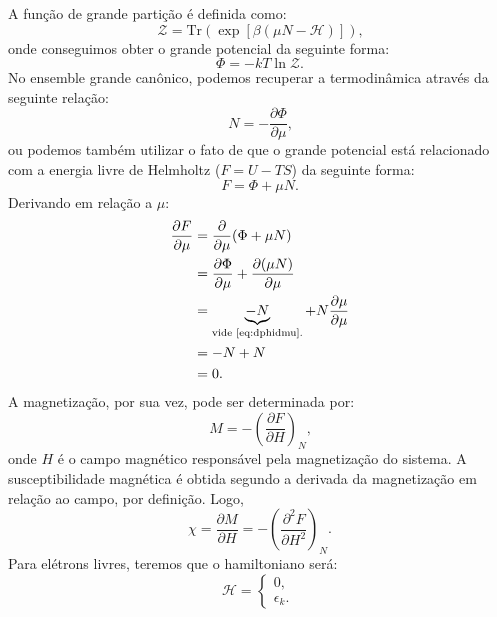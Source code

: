 \documentclass{article}
\newcommand{\Tr}{\mathrm{Tr}}
\begin{document}
A função de grande partição é definida como:
\begin{equation}\label{eq:grandpart}
 \mathcal{Z} = \Tr(\exp{[\beta (\mu N - \mathcal{H})]})\text{,}
\end{equation}
onde conseguimos obter o grande potencial da seguinte forma:
\begin{equation}\label{eq:grandpot}
 \Phi = -k T \ln{\mathcal{Z}}\text{.}
\end{equation}
No ensemble grande canônico, podemos recuperar a termodinâmica através da seguinte relação:
\begin{equation}\label{eq:dphidmu}
 N = - \frac{\partial \Phi}{\partial \mu}\text{,}
\end{equation}
ou podemos também utilizar o fato de que o grande potencial está relacionado com a energia livre de Helmholtz
($F = U - TS$) da seguinte forma: 
\begin{equation}\label{eq:transfleghelm}
 F = \Phi + \mu N\text{.}
\end{equation}
Derivando em relação a $\mu$:
\begin{alignat}{2}
 \frac{\partial F}{\partial \mu} &= \frac{\partial}{\partial \mu} (\Phi + \mu N) \\
 &= \frac{\partial \Phi}{\partial \mu} + \frac{\partial (\mu N)}{\partial \mu} \\
 &= \underbrace{-N}_{\text{vide \eqref{eq:dphidmu}.}} + N\frac{\partial \mu}{\partial \mu} \\
 &= -N + N\\
 &= 0\text{.}
\end{alignat}
A magnetização, por sua vez, pode ser determinada por:
\begin{equation}
 M = - \left( \frac{\partial F}{\partial H} \right)_{N}\text{,}
\end{equation}
onde $H$ é o campo magnético responsável pela magnetização do sistema. A susceptibilidade magnética é obtida segundo a
derivada da magnetização em relação ao campo, por definição. Logo,
\begin{equation}\label{eq:suscept}
 \chi = \frac{\partial M}{\partial H} = - \left( \frac{\partial^2 F}{\partial H^2} \right)_{N}\text{.}
\end{equation}
Para elétrons livres, teremos que o hamiltoniano será:
\begin{equation}
 \mathcal{H} =
     \begin{cases}
       0\text{,}\\
       \epsilon_k\text{.}\ 
     \end{cases}
\end{equation}
\end{document}

